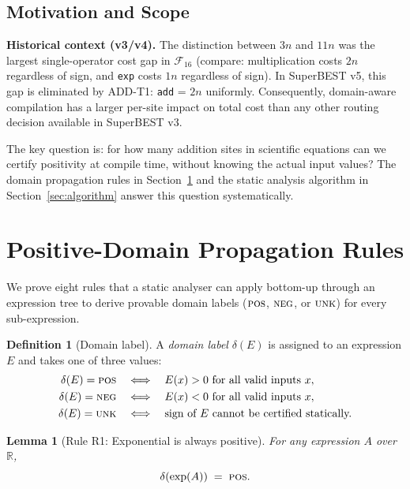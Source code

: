 \documentclass[12pt,a4paper]{article}
\newtheorem{lemma}[theorem]{Lemma}
\theoremstyle{definition}
\newtheorem{definition}[theorem]{Definition}
\newcommand{\POS}{\textsc{pos}}
\newcommand{\NEG}{\textsc{neg}}
\newcommand{\UNK}{\textsc{unk}}
\begin{document}
\subsection{Motivation and Scope}

\textbf{Historical context (v3/v4).}
The distinction between $3n$ and $11n$ was the largest single-operator cost gap
in $\mathcal{F}_{16}$ (compare: multiplication costs $2n$ regardless of sign,
and \texttt{exp} costs $1n$ regardless of sign).
In SuperBEST v5, this gap is eliminated by ADD-T1: \texttt{add} = $2n$ uniformly.
Consequently, domain-aware compilation has a larger per-site impact on total
cost than any other routing decision available in SuperBEST v3.

The key question is: for how many addition sites in scientific equations can we
certify positivity at compile time, without knowing the actual input values?
The domain propagation rules in Section~\ref{sec:rules} and the static analysis
algorithm in Section~\ref{sec:algorithm} answer this question systematically.

\section{Positive-Domain Propagation Rules}
\label{sec:rules}

We prove eight rules that a static analyser can apply bottom-up through an
expression tree to derive provable domain labels ($\POS$, $\NEG$, or $\UNK$)
for every sub-expression.

\begin{definition}[Domain label]
\label{def:domain-label}
A \emph{domain label} $\delta(E)$ is assigned to an expression $E$ and takes
one of three values:
\begin{align*}
  \delta(E) = \POS &\quad\Longleftrightarrow\quad E(x) > 0 \text{ for all valid inputs } x, \\
  \delta(E) = \NEG &\quad\Longleftrightarrow\quad E(x) < 0 \text{ for all valid inputs } x, \\
  \delta(E) = \UNK &\quad\Longleftrightarrow\quad \text{sign of } E \text{ cannot be certified statically.}
\end{align*}
\end{definition}

\begin{lemma}[Rule R1: Exponential is always positive]
\label{lem:R1}
For any expression $A$ over $\mathbb{R}$,
\[
  \delta(\exp(A)) \;=\; \POS.
\]
\end{lemma}
\end{document}
